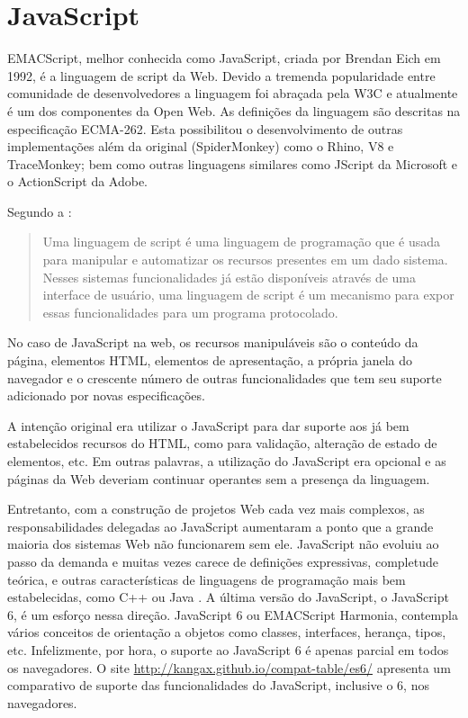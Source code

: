 \section{JavaScript}

EMACScript, melhor conhecida como JavaScript, criada por Brendan
Eich em 1992, é a linguagem de script da Web. Devido a tremenda
popularidade entre comunidade de desenvolvedores a linguagem foi
abraçada pela W3C e atualmente é um dos componentes da Open Web. As
definições da linguagem são descritas na especificação ECMA-262.
Esta possibilitou o desenvolvimento de outras implementações além da
original (SpiderMonkey) como o Rhino, V8 e TraceMonkey; bem como outras
linguagens similares como JScript da Microsoft e o ActionScript da
Adobe.

Segundo a \citet{ecmaSpecificaton}:
\begin{quote}
Uma linguagem de script é uma linguagem de programação que é
usada para manipular e automatizar os recursos presentes em um dado
sistema. Nesses sistemas funcionalidades já estão disponíveis
através de uma interface de usuário, uma linguagem de script é
um mecanismo para expor essas funcionalidades para um programa
protocolado.
\end{quote}

No caso de JavaScript na web, os recursos manipuláveis são o conteúdo
da página, elementos HTML, elementos de apresentação, a própria
janela do navegador e o crescente número de outras funcionalidades que
tem seu suporte adicionado por novas especificações.

A intenção original era utilizar o JavaScript para dar suporte aos já
bem estabelecidos recursos do HTML, como para validação, alteração
de estado de elementos, etc. Em outras palavras, a utilização do
JavaScript era opcional e as páginas da Web deveriam continuar
operantes sem a presença da linguagem.

Entretanto, com a construção de projetos Web cada vez mais
complexos, as responsabilidades delegadas ao JavaScript aumentaram a
ponto que a grande maioria dos sistemas Web não funcionarem sem ele.
JavaScript não evoluiu ao passo da demanda e muitas vezes carece de
definições expressivas, completude teórica, e outras características
de linguagens de programação mais bem estabelecidas, como C++ ou
Java \autocite{crossPlatformMobileGame}. A última versão do JavaScript, o
JavaScript 6, é um esforço nessa direção. JavaScript 6 ou EMACScript
Harmonia, contempla vários conceitos de orientação a objetos como
classes, interfaces, herança, tipos, etc. Infelizmente, por hora, o suporte
ao JavaScript 6 é apenas parcial em todos os navegadores. O site
\url{http://kangax.github.io/compat-table/es6/} apresenta um comparativo de
suporte das funcionalidades do JavaScript, inclusive o 6, nos navegadores.

